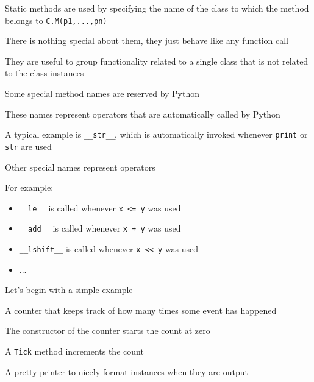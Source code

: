\documentclass{beamer}
\begin{document}
\begin{slide}{
\item Static methods are used by specifying the name of the class to which the method belongs to \texttt{C.M(p1,...,pn)}
\item There is nothing special about them, they just behave like any function call
\item They are useful to group functionality related to a single class that is not related to the class instances
}\end{slide}

\begin{slide}{
\item Some special method names are reserved by Python
\item These names represent operators that are automatically called by Python
\item A typical example is \texttt{\_\_str\_\_}, which is automatically invoked whenever \texttt{print} or \texttt{str} are used
}\end{slide}

\begin{slide}{
\item Other special names represent operators
\item For example: 
\begin{itemize}
\item \texttt{\_\_le\_\_} is called whenever \texttt{x <= y} was used
\item \texttt{\_\_add\_\_} is called whenever \texttt{x + y} was used
\item \texttt{\_\_lshift\_\_} is called whenever \texttt{x << y} was used
\item ...
\end{itemize}
}\end{slide}

\begin{slide}{
\item Let's begin with a simple example
\item A counter that keeps track of how many times some event has happened
\item The constructor of the counter starts the count at zero
\item A \texttt{Tick} method increments the count
\item A pretty printer to nicely format instances when they are output
}\end{slide}
\end{document}
